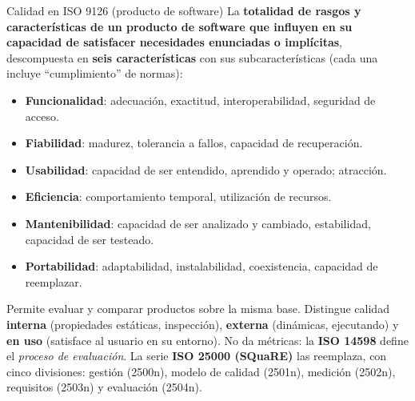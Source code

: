 \documentclass[11pt,a4paper]{article}
\begin{document}
\begin{defbox}{Calidad en ISO 9126 (producto de software)}
La \textbf{totalidad de rasgos y características de un producto de software que influyen en su capacidad de
satisfacer necesidades enunciadas o implícitas}, descompuesta en \textbf{seis características} con sus
subcaracterísticas (cada una incluye ``cumplimiento'' de normas):
\begin{itemize}[leftmargin=*]
  \item \textbf{Funcionalidad}: adecuación, exactitud, interoperabilidad, seguridad de acceso.
  \item \textbf{Fiabilidad}: madurez, tolerancia a fallos, capacidad de recuperación.
  \item \textbf{Usabilidad}: capacidad de ser entendido, aprendido y operado; atracción.
  \item \textbf{Eficiencia}: comportamiento temporal, utilización de recursos.
  \item \textbf{Mantenibilidad}: capacidad de ser analizado y cambiado, estabilidad, capacidad de ser testeado.
  \item \textbf{Portabilidad}: adaptabilidad, instalabilidad, coexistencia, capacidad de reemplazar.
\end{itemize}
\end{defbox}
Permite evaluar y comparar productos sobre la misma base. Distingue calidad
\textbf{interna} (propiedades estáticas, inspección), \textbf{externa} (dinámicas, ejecutando) y \textbf{en uso}
(satisface al usuario en su entorno). No da métricas: la \textbf{ISO 14598} define el \emph{proceso de
evaluación}. La serie \textbf{ISO 25000 (SQuaRE)} las reemplaza, con cinco divisiones: gestión (2500n),
modelo de calidad (2501n), medición (2502n), requisitos (2503n) y evaluación
(2504n).
\end{document}
